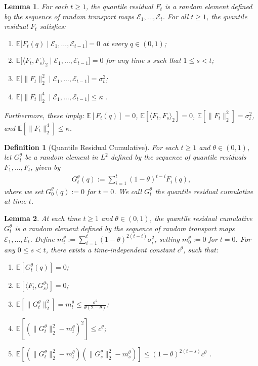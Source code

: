 \documentclass[10pt,a4paper]{amsart}
\newtheorem{lemma}{Lemma}
\newtheorem{definition}{Definition}
\newcommand{\E}{\mathbb E}
\newcommand{\T}{\mathcal E}
\begin{document}
\begin{lemma} \label{lem:residual_property}
	For each $t \ge 1$, the quantile residual $F_{t}$ is a random element defined by the sequence of random transport maps $\T_1, \dots, \T_{t}$.
	For all $t \ge 1$, the quantile residual $F_{t}$ satisfies:
	\begin{enumerate}
		\item $\E\big[ F_{t}(q) \mid \T_1, \dots, \T_{t-1} \big] = 0$ at every $q \in (0, 1)$;
		\item $\E\big[ \langle F_{t}, F_{s} \rangle_2 \mid \T_1, \dots, \T_{t-1} \big] = 0$ for any time $s$ such that $1 \le s < t$;
		\item $\E\big[ \| F_{t} \|_2^2 \mid \T_1, \dots, \T_{t-1} \big] = \sigma_{t}^2$;
		\item $\E\big[ \| F_{t} \|_2^4 \mid \T_1, \dots, \T_{t-1} \big] \le \kappa$ .
	\end{enumerate}
	Furthermore, these imply: $\E[ F_{t}(q) ] = 0$, $\E[ \langle F_{t}, F_{s} \rangle_2 ] = 0$, $\E[ \| F_{t} \|_2^2 ] = \sigma_{t}^2$, and $\E[ \| F_{t} \|_2^4 ] \le \kappa$.
\end{lemma}

\begin{definition}[Quantile Residual Cumulative] \label{def:residual_cumulative}
	For each $t \ge 1$ and $\theta \in (0, 1)$, let $G_t^\theta$ be a random element in $L^2$ defined by the sequence of quantile residuals $F_1, \dots, F_{t}$, given by
	\begin{align}
		G_t^\theta(q) := \sum_{i=1}^{t} (1 - \theta)^{t-i} F_i(q) ,
	\end{align}
    where we set $G_0^\theta(q) := 0$ for $t = 0$.
	We call $G_t^\theta$ the quantile residual cumulative at time $t$.
\end{definition}

\begin{lemma} \label{lem:g_moment}
	At each time $t \ge 1$ and $\theta \in (0, 1)$, the quantile residual cumulative $G_t^\theta$ is a random element defined by the sequence of random transport maps $\T_1, \dots, \T_t$. 
    Define $m_t^\theta := \sum_{i=1}^{t} (1 - \theta)^{2(t-i)} \sigma_i^2$, setting $m_0^\theta := 0$ for $t = 0$.
    For any $0 \le s < t$, there exists a time-independent constant $c^\theta$, such that:
	\begin{enumerate}
        \item $\E[ G_t^\theta(q) ] = 0$;
        \item $\E[ \langle F_t, G_s^\theta \rangle ] = 0$;
		\item $\E[ \| G_t^\theta \|_2^2 ] = m_t^\theta \le \frac{\sigma^2}{\theta (2 - \theta)}$;
		\item $\E[ ( \| G_t^\theta \|_2^2 - m_t^\theta )^2 ] \le c^\theta$;
		\item $\E[ ( \| G_t^\theta \|_2^2 - m_t^\theta ) ( \| G_s^\theta \|_2^2 - m_s^\theta ) ] \le (1 - \theta)^{2(t-s)} c^\theta$ .
	\end{enumerate}
\end{lemma}
\end{document}
